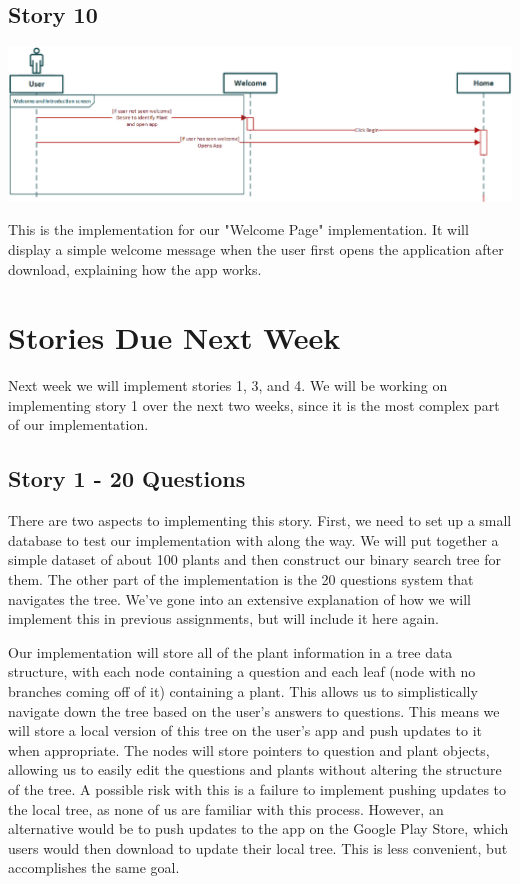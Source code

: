 \documentclass[a4paper]{article}
\begin{document}
\subsection{Story 10}
\begin{center}\includegraphics[scale=.65]{Story10.eps}\end{center}
This is the implementation for our "Welcome Page" implementation. It will display a simple welcome message when the user first opens the application after download, explaining how the app works.

\pagebreak
\section{Stories Due Next Week}
Next week we will implement stories 1, 3, and 4. We will be working on implementing story 1 over the next two weeks, since it is the most complex part of our implementation.

\subsection{Story 1 - 20 Questions}

There are two aspects to implementing this story. First, we need to set up a small database to test our implementation with along the way. We will put together a simple dataset of about 100 plants and then construct our binary search tree for them. The other part of the implementation is the 20 questions system that navigates the tree. We've gone into an extensive explanation of how we will implement this in previous assignments, but will include it here again. 

Our implementation will store all of the plant information in a tree data structure, with each node containing a question and each leaf (node with no branches coming off of it) containing a plant. This allows us to simplistically navigate down the tree based on the user's answers to questions. This means we will store a local version of this tree on the user's app and push updates to it when appropriate. The nodes will store pointers to question and plant objects, allowing us to easily edit the questions and plants without altering the structure of the tree. A possible risk with this is a failure to implement pushing updates to the local tree, as none of us are familiar with this process. However, an alternative would be to push updates to the app on the Google Play Store, which users would then download to update their local tree. This is less convenient, but accomplishes the same goal.
\end{document}
